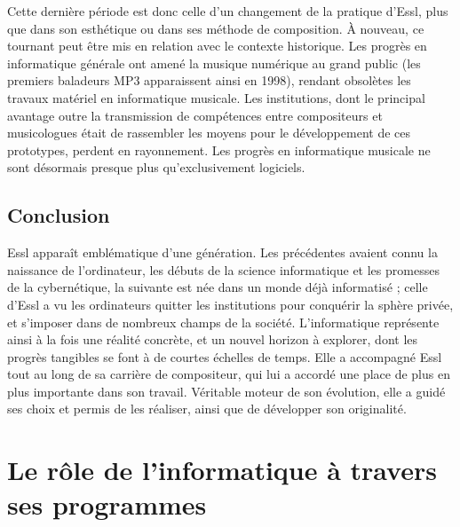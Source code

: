 \documentclass[a4paper,12pt]{article}
\newcommand{\zitat}[2]{\#Citation(#2)\#}
\begin{document}
Cette dernière période est donc celle d'un changement de la pratique d'Essl, plus que dans son esthétique ou dans ses méthode de composition. À nouveau, ce tournant peut être mis en relation avec le contexte historique. Les progrès en informatique générale ont amené la musique numérique au grand public (les premiers baladeurs MP3 apparaissent ainsi en 1998), rendant obsolètes les travaux matériel en informatique musicale. Les institutions, dont le principal avantage outre la transmission de compétences entre compositeurs et musicologues était de rassembler les moyens pour le développement de ces prototypes, perdent en rayonnement. Les progrès en informatique musicale ne sont désormais presque plus qu'exclusivement logiciels.

\subsection{Conclusion}

Essl apparaît emblématique d'une génération. Les précédentes avaient connu la naissance de l'ordinateur, les débuts de la science informatique et les promesses de la cybernétique, la suivante est née dans un monde déjà informatisé ; celle d'Essl a vu les ordinateurs quitter les institutions pour conquérir la sphère privée, et s'imposer dans de nombreux champs de la société. L'informatique représente ainsi à la fois une réalité concrète, et un nouvel horizon à explorer, dont les progrès tangibles se font à de courtes échelles de temps. Elle a accompagné Essl tout au long de sa carrière de compositeur, qui lui a accordé une place de plus en plus importante dans son travail. Véritable moteur de son évolution, elle a guidé ses choix et permis de les réaliser, ainsi que de développer son originalité.




\section{Le rôle de l'informatique à travers ses programmes}
\end{document}
